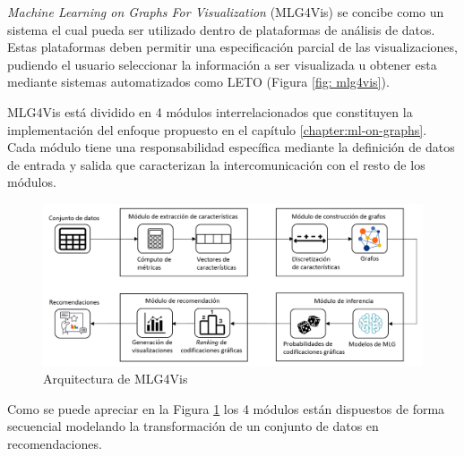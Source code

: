 \textit{Machine Learning on Graphs For Visualization} (MLG4Vis) se concibe como un
sistema el cual pueda ser utilizado dentro de plataformas de an\'alisis de datos. Estas plataformas
deben permitir una especificaci\'on parcial de las visualizaciones, pudiendo el
usuario seleccionar la informaci\'on a ser visualizada u obtener esta mediante sistemas
automatizados como LETO (Figura \ref{fig: mlg4vis}).

MLG4Vis est\'a dividido en 4 m\'odulos interrelacionados que
constituyen la implementaci\'on del enfoque propuesto en el cap\'itulo \ref{chapter:ml-on-graphs}.
Cada m\'odulo
tiene una responsabilidad espec\'ifica mediante la definici\'on de datos
de entrada y salida que caracterizan la intercomunicaci\'on con el resto de los
m\'odulos.

\begin{figure}[h!]
    \includegraphics[width=\linewidth]{Graphics/mlg4vis-arch.png}
    \caption{Arquitectura de MLG4Vis}
    \label{fig: mlg4vis-arch}
\end{figure}

Como se puede apreciar en la Figura \ref{fig: mlg4vis-arch} los
4 m\'odulos est\'an dispuestos de forma secuencial modelando
la transformaci\'on de un conjunto de datos en recomendaciones.

